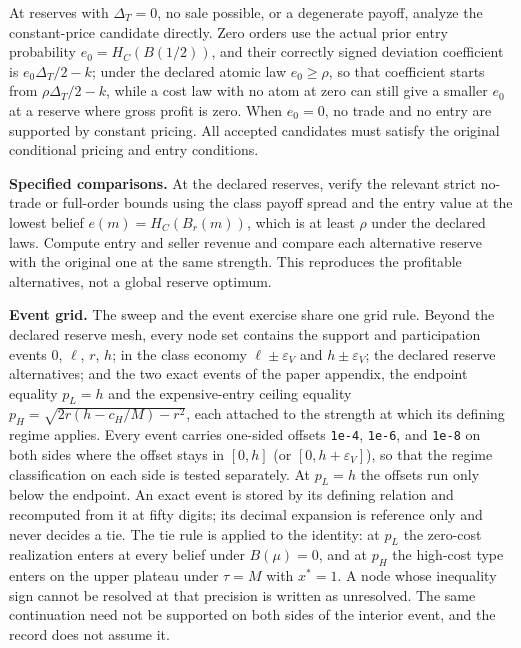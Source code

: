 At reserves with \(\Delta_T=0\), no sale possible, or a degenerate
payoff, analyze the constant-price candidate directly. Zero orders use the
actual prior entry probability \(e_0=H_C(B(1/2))\), and their correctly
signed deviation coefficient is \(e_0\Delta_T/2-k\); under the declared
atomic law \(e_0\ge\rho\), so that coefficient starts from
\(\rho\Delta_T/2-k\), while a cost law with no atom at zero can still give a
smaller \(e_0\) at a reserve where gross profit is zero. When \(e_0=0\), no trade and no
entry are supported by constant pricing. All accepted candidates must
satisfy the original conditional pricing and entry conditions.

\textbf{Specified comparisons.} At the declared reserves, verify the
relevant strict no-trade or full-order bounds using the class payoff
spread and the entry value at the lowest belief \(e(m)=H_C(B_r(m))\),
which is at least \(\rho\) under the declared laws. Compute entry and
seller revenue and compare each alternative reserve with the original
one at the same strength. This reproduces the profitable alternatives,
not a global reserve optimum.

\textbf{Event grid.} The sweep and the event exercise share one grid
rule. Beyond the declared reserve mesh, every node set contains the
support and participation events \(0\), \(\ell\), \(r\), \(h\); in the
class economy \(\ell\pm\varepsilon_V\) and \(h\pm\varepsilon_V\); the
declared reserve alternatives; and the two exact events of the paper
appendix, the endpoint equality \(p_L=h\) and the
expensive-entry ceiling equality \(p_H=\sqrt{2r(h-c_H/M)-r^2}\), each
attached to the strength at which its defining regime applies. Every
event carries one-sided offsets \texttt{1e-4}, \texttt{1e-6}, and
\texttt{1e-8} on both sides where the offset stays in \([0,h]\) (or
\([0,h+\varepsilon_V]\)), so that the regime classification on each side
is tested separately. At \(p_L=h\) the offsets run only below the endpoint.
An exact event is stored by its defining relation
and recomputed from it at fifty digits; its decimal expansion is
reference only and never decides a tie. The tie rule is applied to the
identity: at \(p_L\) the zero-cost realization enters at every belief under
\(B(\mu)=0\), and at \(p_H\) the high-cost type enters on the upper
plateau under \(\tau=M\) with \(x^*=1\). A node whose inequality sign
cannot be resolved at that precision is written as unresolved. The same
continuation need not be supported on both sides of the interior event, and the
record does not assume it.

